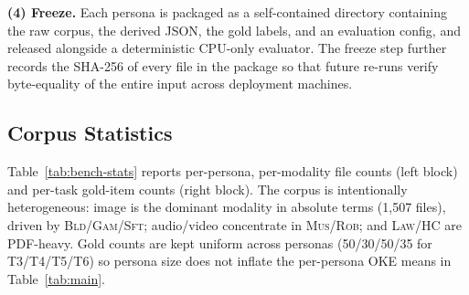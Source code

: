 \documentclass{article}
\begin{document}
\noindent\textbf{(4) Freeze.} Each persona is packaged as a self-contained directory containing the raw corpus, the derived JSON, the gold labels, and an evaluation config, and released alongside a deterministic CPU-only evaluator. The freeze step further records the SHA-256 of every file in the package so that future re-runs verify byte-equality of the entire input across deployment machines.

\subsection{Corpus Statistics}\label{app:bench-stat}

Table~\ref{tab:bench-stats} reports per-persona, per-modality file counts (left block) and per-task gold-item counts (right block). The corpus is intentionally heterogeneous: image is the dominant modality in absolute terms (1{,}507 files), driven by \textsc{Bld}/\textsc{Gam}/\textsc{Sft}; audio/video concentrate in \textsc{Mus}/\textsc{Rob}; and \textsc{Law}/\textsc{HC} are PDF-heavy. Gold counts are kept uniform across personas (50/30/50/35 for T3/T4/T5/T6) so persona size does not inflate the per-persona OKE means in Table~\ref{tab:main}.
\end{document}
